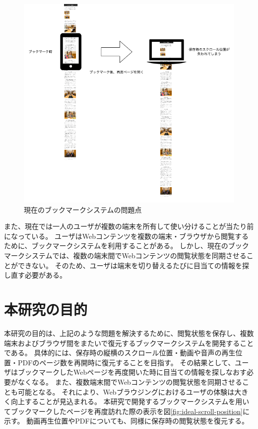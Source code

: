 \begin{figure}[htbp]
  \caption{現在のブックマークシステムの問題点}
  \label{fig:probrem-scroll-position}
  \begin{center}
    \includegraphics[bb=0 0 681 641,width=15cm]{img/010_introduction/probrem-scroll-position.pdf}
  \end{center}
\end{figure}

また、現在では一人のユーザが複数の端末を所有して使い分けることが当たり前になっている。
ユーザはWebコンテンツを複数の端末・ブラウザから閲覧するために、ブックマークシステムを利用することがある。
しかし、現在のブックマークシステムでは、複数の端末間でWebコンテンツの閲覧状態を同期させることができない。
そのため、ユーザは端末を切り替えるたびに目当ての情報を探し直す必要がある。


\section{本研究の目的}
本研究の目的は、上記のような問題を解決するために、閲覧状態を保存し、複数端末およびブラウザ間をまたいで復元するブックマークシステムを開発することである。
具体的には、保存時の縦横のスクロール位置・動画や音声の再生位置・PDFのページ数を再開時に復元することを目指す。
その結果として、ユーザはブックマークしたWebページを再度開いた時に目当ての情報を探しなおす必要がなくなる。
また、複数端末間でWebコンテンツの閲覧状態を同期させることも可能となる。
それにより、Webブラウジングにおけるユーザの体験は大きく向上することが見込まれる。
本研究で開発するブックマークシステムを用いてブックマークしたページを再度訪れた際の表示を図\ref{fig:ideal-scroll-position}に示す。
動画再生位置やPDFについても、同様に保存時の閲覧状態を復元する。

